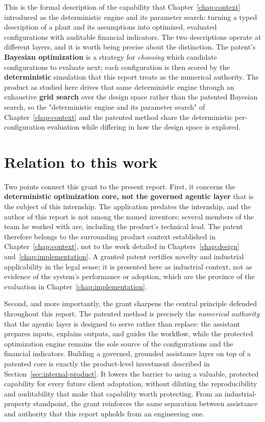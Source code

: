 This is the formal description of the capability that
Chapter~\ref{chap:context} introduced as the deterministic engine and its
parameter search: turning a typed description of a plant and its assumptions into
optimized, evaluated configurations with auditable financial indicators. The two
descriptions operate at different layers, and it is worth being precise about the
distinction. The patent's \textbf{Bayesian optimization} is a strategy for
\emph{choosing} which candidate configurations to evaluate next; each configuration
is then scored by the \textbf{deterministic} simulation that this report treats as
the numerical authority. The product as studied here drives that same deterministic
engine through an exhaustive \textbf{grid search} over the design space rather than
the patented Bayesian search, so the "deterministic engine and its parameter search"
of Chapter~\ref{chap:context} and the patented method share the deterministic
per-configuration evaluation while differing in how the design space is explored.

\section*{Relation to this work}

Two points connect this grant to the present report. First, it concerns the
\textbf{deterministic optimization core, not the governed agentic layer} that is
the subject of this internship. The application predates the internship, and the
author of this report is not among the named inventors; several members of the
team he worked with are, including the product's technical lead. The patent
therefore belongs to the surrounding product context established in
Chapter~\ref{chap:context}, not to the work detailed in
Chapters~\ref{chap:design} and~\ref{chap:implementation}. A granted patent
certifies novelty and industrial applicability in the legal sense; it is presented
here as industrial context, not as evidence of the system's performance or adoption,
which are the province of the evaluation in Chapter~\ref{chap:implementation}.

Second, and more importantly, the grant sharpens the central principle defended
throughout this report. The patented method is precisely the \emph{numerical
authority} that the agentic layer is designed to serve rather than replace: the
assistant prepares inputs, explains outputs, and guides the workflow, while the
protected optimization engine remains the sole source of the configurations and
the financial indicators. Building a governed, grounded assistance layer on top of
a patented core is exactly the product-level investment described in
Section~\ref{sec:internal-product}. It lowers the barrier to using a valuable,
protected capability for every future client adaptation, without diluting the
reproducibility and auditability that make that capability worth protecting. From
an industrial-property standpoint, the grant reinforces the same separation between
assistance and authority that this report upholds from an engineering one.
